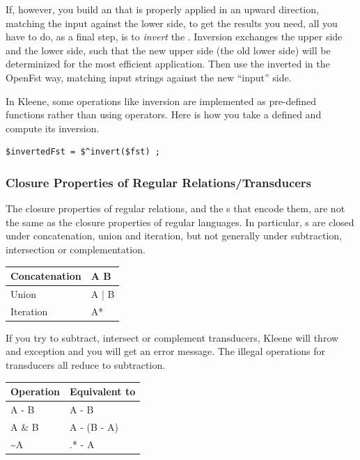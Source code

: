 If, however, you build an \fst{}
that is properly applied in an upward direction, matching the input
against the lower side, to get the results you need, all you have to do,
as a final step, is to \emph{invert} the \fst{}.  Inversion exchanges the upper
side and the lower side, such that the new upper side (the old lower
side) will be determinized for the most efficient application.  Then use
the inverted \fst{} in the OpenFst way, matching input strings against the
new ``input'' side.

In Kleene, some operations like inversion are implemented as pre-defined
functions rather than using operators.  Here is how you take a defined
\fst{} and compute its inversion.

\begin{Verbatim}
$invertedFst = $^invert($fst) ;
\end{Verbatim}

\subsubsection{Closure Properties of Regular Relations/Transducers}

The closure properties of regular relations, and the \fst{}s that encode them, are not
the same as the closure properties of regular languages.  In particular, \fst{}s are closed
under concatenation, union and iteration, but not generally under subtraction, intersection
or complementation.

\vspace{4mm}

\begin{tabular}{|l|l|}
\hline
Concatenation 	& A B \\
\hline
Union         	& A | B \\
\hline
Iteration	  	& A*\\
\hline
\end{tabular}

\vspace{4mm}

\noindent
If you try to subtract, intersect or complement transducers, Kleene will
throw and exception and you will get an error message.
The illegal operations for transducers all reduce to subtraction.

\vspace{4mm}

\begin{tabular}{|l|l|}
\hline
Operation & Equivalent to \\
\hline
A - B  &  A - B \\
A \& B  &  A - (B - A)\\
\~{}A   &  .* - A\\
\hline
\end{tabular}

